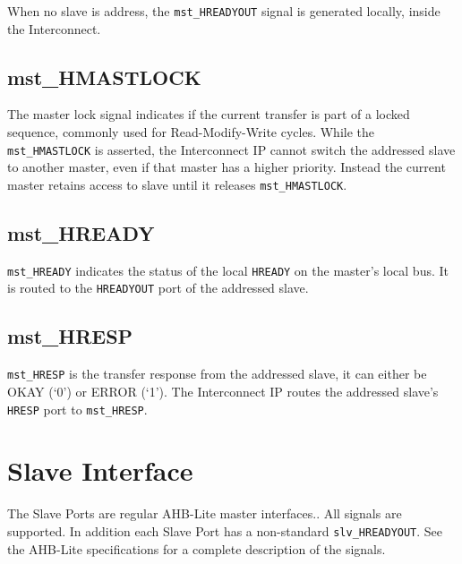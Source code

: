 When no slave is address, the \texttt{mst\_HREADYOUT} signal is generated
locally, inside the Interconnect.

\subsection{mst\_HMASTLOCK}\label{mst_hmastlock}

The master lock signal indicates if the current transfer is part of a
locked sequence, commonly used for Read-Modify-Write cycles. While the
\texttt{mst\_HMASTLOCK} is asserted, the Interconnect IP cannot switch the
addressed slave to another master, even if that master has a higher
priority. Instead the current master retains access to slave until it
releases \texttt{mst\_HMASTLOCK}.

\subsection{mst\_HREADY}\label{mst_hready}

\texttt{mst\_HREADY} indicates the status of the local \texttt{HREADY} on the master's
local bus. It is routed to the \texttt{HREADYOUT} port of the addressed slave.

\subsection{mst\_HRESP}\label{mst_hresp}

\texttt{mst\_HRESP} is the transfer response from the addressed slave, it can
either be OKAY (`0') or ERROR (`1'). The Interconnect IP routes the
addressed slave's \texttt{HRESP} port to \texttt{mst\_HRESP}.

\section{Slave Interface}\label{slave-interface}

The Slave Ports are regular AHB-Lite master interfaces.. All signals are
supported. In addition each Slave Port has a non-standard
\texttt{slv\_HREADYOUT}. See the AHB-Lite specifications for a complete
description of the signals.

